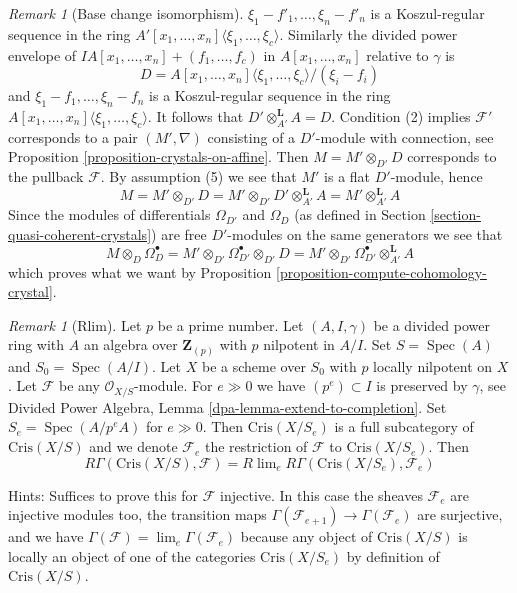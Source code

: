 \documentclass{stacks-project}
\theoremstyle{plain}
\theoremstyle{definition}
\theoremstyle{remark}
\newtheorem{remark}[subsection]{Remark}
\numberwithin{equation}{subsection}
\def\lim{\mathop{\mathrm{lim}}\nolimits}
\def\Spec{\mathop{\mathrm{Spec}}}
\begin{document}
\begin{remark}[Base change isomorphism]
$\xi_1 - f'_1, \ldots, \xi_n - f'_n$ is a Koszul-regular sequence in the
ring $A'[x_1, \ldots, x_n]\langle \xi_1, \ldots, \xi_c\rangle$.
Similarly the divided power envelope of
$IA[x_1, \ldots, x_n] + (f_1, \ldots, f_c)$ in $A[x_1, \ldots, x_n]$
relative to $\gamma$ is
$$
D = A[x_1, \ldots, x_n]\langle \xi_1, \ldots, \xi_c\rangle/(\xi_i - f_i)
$$
and $\xi_1 - f_1, \ldots, \xi_n - f_n$ is a Koszul-regular sequence in the
ring $A[x_1, \ldots, x_n]\langle \xi_1, \ldots, \xi_c\rangle$.
It follows that $D' \otimes_{A'}^\mathbf{L} A = D$. Condition (2)
implies $\mathcal{F}'$ corresponds to a pair $(M', \nabla)$
consisting of a $D'$-module with connection, see
Proposition \ref{proposition-crystals-on-affine}.
Then $M = M' \otimes_{D'} D$ corresponds to the pullback $\mathcal{F}$.
By assumption (5) we see that $M'$ is a flat $D'$-module, hence
$$
M = M' \otimes_{D'} D = M' \otimes_{D'} D' \otimes_{A'}^\mathbf{L} A
= M' \otimes_{A'}^\mathbf{L} A
$$
Since the modules of differentials $\Omega_{D'}$ and $\Omega_D$
(as defined in Section \ref{section-quasi-coherent-crystals})
are free $D'$-modules on the same generators we see that
$$
M \otimes_D \Omega^\bullet_D =
M' \otimes_{D'} \Omega^\bullet_{D'} \otimes_{D'} D =
M' \otimes_{D'} \Omega^\bullet_{D'} \otimes_{A'}^\mathbf{L} A
$$
which proves what we want by
Proposition \ref{proposition-compute-cohomology-crystal}.
\end{remark}

\begin{remark}[Rlim]
\label{remark-rlim}
Let $p$ be a prime number. Let $(A, I, \gamma)$ be a divided power
ring with $A$ an algebra over $\mathbf{Z}_{(p)}$ with $p$ nilpotent
in $A/I$. Set $S = \Spec(A)$ and $S_0 = \Spec(A/I)$.
Let $X$ be a scheme over $S_0$ with $p$ locally
nilpotent on $X$. Let $\mathcal{F}$ be any
$\mathcal{O}_{X/S}$-module. For $e \gg 0$ we have $(p^e) \subset I$
is preserved by $\gamma$, see
Divided Power Algebra, Lemma \ref{dpa-lemma-extend-to-completion}.
Set $S_e = \Spec(A/p^eA)$ for $e \gg 0$.
Then $\text{Cris}(X/S_e)$ is a full subcategory of $\text{Cris}(X/S)$
and we denote $\mathcal{F}_e$ the restriction of $\mathcal{F}$ to
$\text{Cris}(X/S_e)$. Then
$$
R\Gamma(\text{Cris}(X/S), \mathcal{F}) =
R\lim_e R\Gamma(\text{Cris}(X/S_e), \mathcal{F}_e)
$$

\medskip\noindent
Hints: Suffices to prove this for $\mathcal{F}$ injective.
In this case the sheaves $\mathcal{F}_e$ are injective
modules too, the transition maps
$\Gamma(\mathcal{F}_{e + 1}) \to \Gamma(\mathcal{F}_e)$ are
surjective, and we have
$\Gamma(\mathcal{F}) = \lim_e \Gamma(\mathcal{F}_e)$ because
any object of $\text{Cris}(X/S)$ is locally an object of one
of the categories $\text{Cris}(X/S_e)$ by definition of
$\text{Cris}(X/S)$.
\end{remark}
\end{document}
